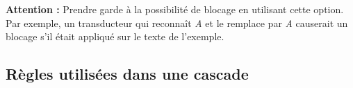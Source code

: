 \bigskip
\noindent \textbf{Attention :} Prendre garde à la possibilité de blocage en utilisant cette 
option. Par exemple, un transducteur qui reconnaît \emph{A} et le remplace par
\emph{A} causerait un blocage s'il était appliqué sur le texte de l'exemple.

\subsection{Règles utilisées dans une cascade}

